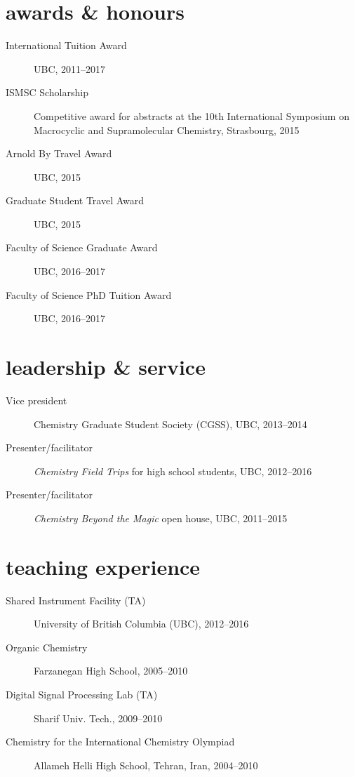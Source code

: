 \documentclass[overlapped,line,10pt,letterpaper]{res}
\begin{document}
\begin{resume}
\section{awards \& honours}
\begin{description}
\item[International Tuition Award] UBC, 2011–2017
\item[ISMSC Scholarship] Competitive award for abstracts at the 10th International Symposium on Macrocyclic and Supramolecular Chemistry, Strasbourg, 2015
\item[Arnold By Travel Award] UBC, 2015
\item[Graduate Student Travel Award] UBC, 2015
\item[Faculty of Science Graduate Award] UBC, 2016–2017
\item[Faculty of Science PhD Tuition Award] UBC, 2016–2017
\end{description}
\section{leadership \& service}
\begin{description}
\item[Vice president] Chemistry Graduate Student Society (CGSS), UBC, 2013–2014
\item[Presenter/facilitator] \emph{Chemistry Field Trips} for high school students, UBC, 2012–2016
\item[Presenter/facilitator] \emph{Chemistry Beyond the Magic} open house, UBC, 2011–2015
\end{description}

\section{teaching experience}
\begin{description}
\item[Shared Instrument Facility (TA)] University of British Columbia (UBC), 2012–2016
\item[Organic Chemistry] Farzanegan High School, 2005–2010
\item[Digital Signal Processing Lab (TA)] Sharif Univ. Tech., 2009–2010
\item[Chemistry for the International Chemistry Olympiad] Allameh Helli High School, Tehran, Iran, 2004–2010
\end{description}


\end{resume}
\end{document}
